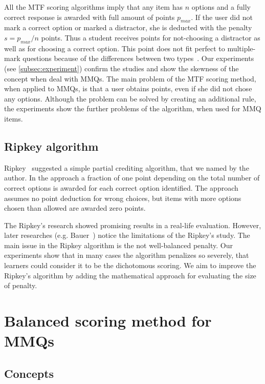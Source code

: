All the MTF scoring algorithms imply that any item has $n$ options and a fully correct response is awarded with full amount of points $p_{max}$.
If the user did not mark a correct option or marked a distractor, she is deducted with the penalty $s = p_{max}/n$ points.
Thus a student receives points for not-choosing a distractor as well as for choosing a correct option.
This point does not fit perfect to multiple-mark questions because of the differences between two types~\cite{Pomplun1997,Cronbach,Frisbie1992}.
Our experiments (see \autoref{subsec:experiment}) confirm the studies and show the skewness of the concept when deal with MMQs.
The main problem of the MTF scoring method, when applied to MMQs, is that a user obtains points, even if she did not chose any options. 
Although the problem can be solved by creating an additional rule,
the experiments show the further problems of the algorithm, when used for MMQ items. 


\subsection{Ripkey algorithm}

Ripkey~\cite{Ripkey1996} suggested a simple partial crediting algorithm, that we named by the author.
In the approach a fraction of one point depending on the total number of correct options is awarded for each correct option identified.
The approach assumes no point deduction for wrong choices, but items with more options chosen than allowed are awarded zero points.

The Ripkey's research showed promising results in a real-life evaluation.
However, later researches (e.g. Bauer~\cite{Bauer2011}) notice the limitations of the Ripkey's study.
The main issue in the Ripkey algorithm is the not well-balanced penalty.
Our experiments show that in many cases the algorithm penalizes so severely, that learners could consider it to be the dichotomous scoring. 
We aim to improve the Ripkey's algorithm by adding the mathematical approach for evaluating the size of penalty.

\section{Balanced scoring method for MMQs}
\label{sec:method}

\subsection{Concepts} %
\label{subsec:concepts}

